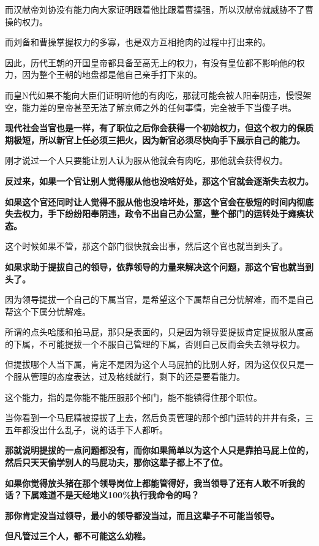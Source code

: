\documentclass[UTF8, 11pt, oneside]{ctexart}
\newcommand{\zd}[1]{\textbf{\textcolor[RGB]{123,12,0}{#1}}} %
\begin{document}
而汉献帝刘协没有能力向大家证明跟着他比跟着曹操强，所以汉献帝就威胁不了曹操的权力。

而刘备和曹操掌握权力的多寡，也是双方互相抢肉的过程中打出来的。

因此，历代王朝的开国皇帝都具备至高无上的权力，有没有皇位都不影响他的权力，因为整个王朝的地盘都是他自己亲手打下来的。

而皇N代如果不能向大臣们证明听他的有肉吃，那就可能会被人阳奉阴违，慢慢架空，能力差的皇帝甚至无法了解京师之外的任何事情，完全被手下当傻子哄。

\zd{现代社会当官也是一样，有了职位之后你会获得一个初始权力，但这个权力的保质期极短，所以新官上任必须三把火，因为新官必须尽快向手下展示自己的能力。}

刚才说过一个人只要能让别人认为服从他就会有肉吃，那他就会获得权力。

\zd{反过来，如果一个官让别人觉得服从他也没啥好处，那这个官就会逐渐失去权力。}

\zd{如果这个官还同时让人觉得不服从他也没啥坏处，那这个官会在极短的时间内彻底失去权力，手下纷纷阳奉阴违，政令不出自己办公室，整个部门的运转处于瘫痪状态。}

这个时候如果不管，那这个部门很快就会出事，然后这个官也就当到头了。

\zd{如果求助于提拔自己的领导，依靠领导的力量来解决这个问题，那这个官也就当到头了。}

因为领导提拔一个自己的下属当官，是希望这个下属帮自己分忧解难，而不是自己帮这个下属分忧解难。

所谓的点头哈腰和拍马屁，那只是表面的，只是因为领导要提拔肯定提拔服从度高的下属，不可能提拔一个不服自己管理的下属，否则自己反而会失去领导权力。

但提拔哪个人当下属，肯定不是因为这个人马屁拍的比别人好，因为这仅仅只是一个服从管理的态度表达，过及格线就行，剩下的还是要看能力。

这个能力，指的是你能不能压服那个部门，能不能镇得住那个职位。

当你看到一个马屁精被提拔了上去，然后负责管理的那个部门运转的井井有条，三五年都没出什么乱子，说的话手下人都听。

\zd{那就说明提拔的一点问题都没有，而你如果简单以为这个人只是靠拍马屁上位的，然后只天天偷学别人的马屁功夫，那你这辈子都上不了位。}

\zd{如果你觉得放头猪在那个领导岗位上都能管得好，我当领导了还有人敢不听我的话？下属难道不是天经地义100\%执行我命令的吗？}

\zd{那你肯定没当过领导，最小的领导都没当过，而且这辈子不可能当领导。}

\zd{但凡管过三个人，都不可能这么幼稚。}
\end{document}

